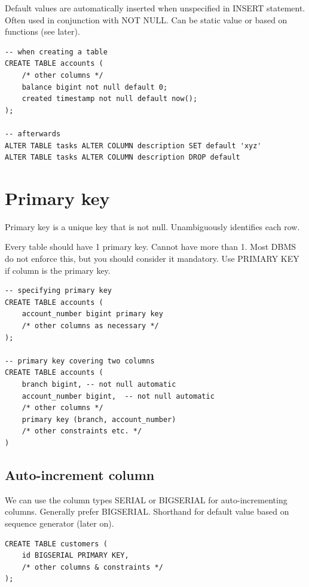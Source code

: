 \documentclass{pgnotes}
\begin{document}
Default values are automatically inserted when unspecified in INSERT
statement.
Often used in conjunction with NOT NULL.
Can be static value or based on functions (see later).

\begin{verbatim}
-- when creating a table
CREATE TABLE accounts (
    /* other columns */
    balance bigint not null default 0;
    created timestamp not null default now(); 
);

-- afterwards
ALTER TABLE tasks ALTER COLUMN description SET default 'xyz'
ALTER TABLE tasks ALTER COLUMN description DROP default
\end{verbatim}


\section{Primary key}
\label{sec:primary-key}

Primary key is a unique key that is not null.
Unambiguously identifies each row.

Every table should have 1 primary key.
Cannot have more than 1. 
Most DBMS do not enforce this, but you should consider it mandatory.
Use PRIMARY KEY if column is the primary key. 

\begin{verbatim}
-- specifying primary key
CREATE TABLE accounts ( 
    account_number bigint primary key
    /* other columns as necessary */
);

-- primary key covering two columns
CREATE TABLE accounts (
    branch bigint, -- not null automatic
    account_number bigint,  -- not null automatic
    /* other columns */
    primary key (branch, account_number)
    /* other constraints etc. */
)
\end{verbatim}



\subsection{Auto-increment column}
\label{sec:auto-increment-column}

We can use the column types SERIAL or BIGSERIAL for auto-incrementing columns.
Generally prefer BIGSERIAL.
Shorthand for default value based on sequence generator (later on).

\begin{verbatim}
CREATE TABLE customers ( 
    id BIGSERIAL PRIMARY KEY,
    /* other columns & constraints */
);
\end{verbatim}
\end{document}

